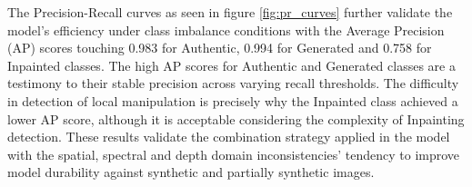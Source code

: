 The Precision-Recall curves as seen in figure \ref{fig:pr_curves} further
validate the model's efficiency under class imbalance conditions with the
Average Precision (AP) scores touching 0.983 for Authentic, 0.994 for Generated
and 0.758 for Inpainted classes. The high AP scores for Authentic and Generated
classes are a testimony to their stable precision across varying recall
thresholds. The difficulty in detection of local manipulation is precisely why
the Inpainted class achieved a lower AP score, although it is acceptable
considering the complexity of Inpainting detection. These results validate the
combination strategy applied in the model with the spatial, spectral and depth
domain inconsistencies' tendency to improve model durability against synthetic
and partially synthetic images.
